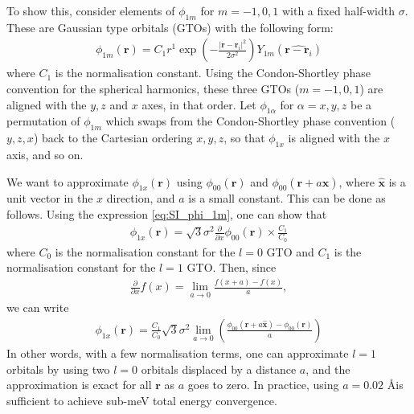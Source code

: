 \documentclass[aps,%
superscriptaddress,
 amsmath,amssymb,
floatfix,
twocolumn
]{revtex4-2}
\begin{document}
To show this, consider elements of $\phi_{1m}$ for $m=-1,0,1$ with a fixed half-width $\sigma$. These are Gaussian type orbitals (GTOs) with the following form:
\begin{align}
    \phi_{1m}(\mathbf{r}) = C_1 r^1 \exp\left(-\frac{|\mathbf{r} - \mathbf{r}_i|^2}{2\sigma^2}\right) Y_{1m}\!\left(\widehat{\mathbf{r} - \mathbf{r}_i}\right)
    \label{eq:SI_phi_1m}
\end{align}
where $C_1$ is the normalisation constant. Using the Condon-Shortley phase convention for the spherical harmonics, these three GTOs ($m=-1,0,1$) are aligned with the $y, z$ and $x$ axes, in that order. Let $\phi_{1\alpha}$ for $\alpha=x,y,z$ be a permutation of $\phi_{1 m}$ which swaps from the Condon-Shortley phase convention ($y,z,x$) back to the Cartesian ordering $x,y,z$, so that $\phi_{1x}$ is aligned with the $x$ axis, and so on.

We want to approximate $\phi_{1x}(\mathbf{r})$ using $\phi_{00}(\mathbf{r})$ and $\phi_{00}(\mathbf{r} + a \hat{\mathbf{x}})$, where $\hat{\mathbf{x}}$ is a unit vector in the $x$ direction, and $a$ is a small constant. This can be done as follows. Using the expression \eqref{eq:SI_phi_1m}, one can show that
\begin{align}
    \phi_{1 x}(\mathbf{r}) = \sqrt{3}\sigma^2\frac{\partial}{\partial x} \phi_{0 0}(\mathbf{r}) \times \frac{C_{1}}{C_{0}}
\end{align}
where $C_0$ is the normalisation constant for the $l=0$ GTO and $C_1$ is the normalisation constant for the $l=1$ GTO. Then, since
\begin{align}
    \frac{\partial}{\partial x} f(x) = \lim_{a\rightarrow0}\frac{f(x+a) - f(x)}{a},
\end{align}
we can write
\begin{align}
    \phi_{1 x}(\mathbf{r}) = \frac{C_1}{C_0} \sqrt{3}\sigma^2 \lim_{a\rightarrow 0} \left( \frac{\phi_{0 0}(\mathbf{r}+a\hat{\mathbf{x}}) - \phi_{0 0}(\mathbf{r})}{a} \right) 
\end{align}
In other words, with a few normalisation terms, one can approximate $l=1$ orbitals by using two $l=0$ orbitals displaced by a distance $a$, and the approximation is exact for all $\mathbf{r}$ as $a$ goes to zero. In practice, using $a=0.02$ \AA \space is sufficient to achieve sub-meV total energy convergence.
\end{document}
